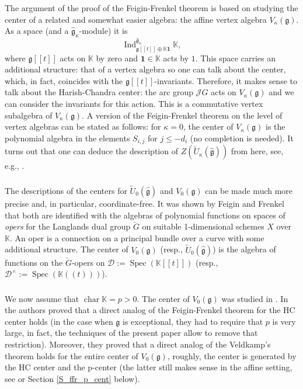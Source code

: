 \documentclass{amsart}
\theoremstyle{definition}
\newcommand{\sss}{\subsubsection{}}
\newcommand{\D}{\sD}
\newcommand{\sD}{\mathscr{D}}
\newcommand{\g}{\mathfrak{g}}
\newcommand{\hg}{\hat{\mathfrak{g}}}
\newcommand{\Jet}{\mathscr{J}}
\newcommand{\bK}{\mathbb{K}}
\renewcommand{\bK}{\mathbb{K}} %
\numberwithin{equation}{section}
\begin{document}
\sss The argument of the proof of the Feigin-Frenkel theorem is based on studying the center of a related and somewhat easier algebra: the affine vertex algebra $V_\kappa(\g)$. As a space
(and a $\hat{\g}_\kappa$-module) it is 
$$\operatorname{Ind}_{\g[[t]]\oplus \bK \mathbf{1}}^{\hg_\kappa}\bK,$$
where $\g[[t]]$ acts on $\bK$ by zero and $\mathbf{1}\in \bK$ acts
by $1$. This space carries an additional structure: that of a vertex algebra so one can talk about the center, which, in fact, coincides with the $\g[[t]]$-invariants. Therefore, it makes sense to talk about the Harish-Chandra center: the arc group $\Jet G$ acts on $V_\kappa(\g)$ and we can consider the invariants for this action. This is a commutative vertex subalgebra of $V_\kappa(\g)$. A version of the Feigin-Frenkel theorem on the level of vertex algebras 
can be stated as follows: for $\kappa=0$, the center of $V_\kappa(\g)$ is the polynomial algebra in the elements $S_{i,j}$ for $j\leqslant -d_i$ (no completion is needed). It turns out that one can deduce the description of $Z(\widetilde{U}_\kappa(\hg))$
from here, see, e.g., \cite[Sec. 4.3]{Frenkel_loop}. 

\sss The descriptions of the centers for $\widetilde{U}_0(\hg)$ and $V_0(\g)$ can be made much more precise and, in particular, coordinate-free. It was shown by Feigin and Frenkel that both are identified with the algebras of polynomial functions on spaces of {\it opers} for the Langlands dual group $\check{G}$ on suitable 1-dimensional schemes $X$ over $\bK$. An oper is a connection on a principal bundle over a curve with some additional structure. 
The center of $V_0(\g)$ (resp., $\widetilde{U}_0(\hg)$) is the algebra of functions on the $\check{G}$-opers on $\D:=\operatorname{Spec}(\bK[[t]])$ (resp., $\D^\times:=\operatorname{Spec}(\bK(\!(t)\!))$).

\sss We now assume that $\operatorname{char}\bK=p>0$.
The center of $V_0(\g)$ was studied in \cite{ATV}. In 
\cite[Theorem 1.3]{ATV} the authors proved that a direct analog of the Feigin-Frenkel theorem for the HC center holds (in the case when $\g$ is exceptional, they had to require that $p$ is very large, in fact, the techniques of the present paper allow to remove that restriction). Moreover, they proved that a direct analog of the Veldkamp's theorem holds for the entire center of $V_0(\g)$, roughly, the center is generated by the HC center and the p-center (the latter still makes sense
in the affine setting, see \cite{AW} or Section \ref{S_ffr_p_cent} below). 
\end{document}
